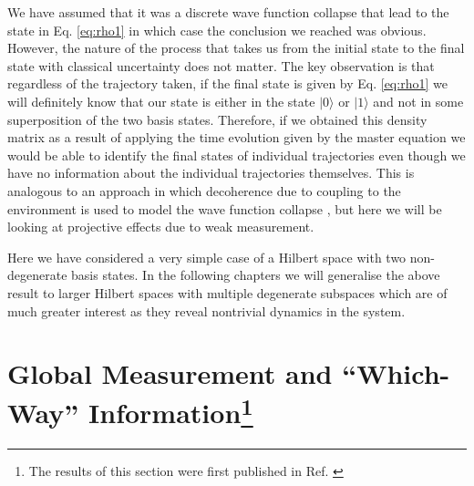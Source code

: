 We have assumed that it was a discrete wave function collapse that lead
to the state in Eq. \eqref{eq:rho1} in which case the conclusion we
reached was obvious. However, the nature of the process that takes us
from the initial state to the final state with classical uncertainty
does not matter. The key observation is that regardless of the
trajectory taken, if the final state is given by Eq. \eqref{eq:rho1}
we will definitely know that our state is either in the state
$| 0 \rangle$ or $| 1 \rangle$ and not in some superposition of the
two basis states. Therefore, if we obtained this density matrix as a
result of applying the time evolution given by the master equation we
would be able to identify the final states of individual trajectories
even though we have no information about the individual trajectories
themselves. This is analogous to an approach in which decoherence due to
coupling to the environment is used to model the wave function collapse
\cite{zurek2002}, but here we will be looking at projective effects
due to weak measurement.

Here we have considered a very simple case of a Hilbert space with two
non-degenerate basis states. In the following chapters we will
generalise the above result to larger Hilbert spaces with multiple
degenerate subspaces which are of much greater interest as they reveal
nontrivial dynamics in the system.

\section[Global Measurement and ``Which-Way'' Information]
        {Global Measurement and ``Which-Way'' Information\footnote{The
            results of this section were first published in
            Ref. \cite{elliott2015}}}
\label{sec:modes}

